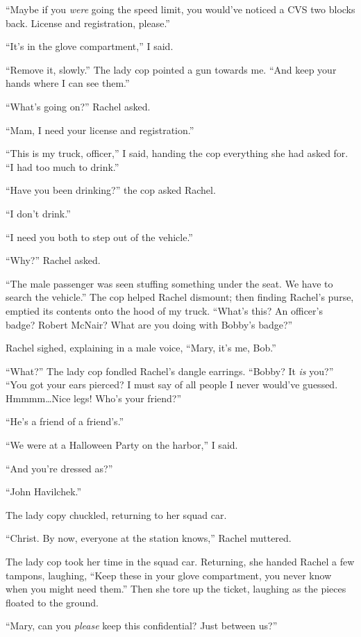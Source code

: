 ``Maybe if you \emph{were} going the speed limit, you would've noticed a
CVS two blocks back. License and registration, please.''

``It's in the glove compartment,'' I said.

``Remove it, slowly.'' The lady cop pointed a gun towards me. ``And keep
your hands where I can see them.''

``What's going on?'' Rachel asked.

``Mam, I need your license and registration.''

``This is my truck, officer,'' I said, handing the cop everything she
had asked for. ``I had too much to drink.''

``Have you been drinking?'' the cop asked Rachel.

``I don't drink.''

``I need you both to step out of the vehicle.''

``Why?'' Rachel asked.

``The male passenger was seen stuffing something under the seat. We have
to search the vehicle.'' The cop helped Rachel dismount; then finding
Rachel's purse, emptied its contents onto the hood of my truck. ``What's
this? An officer's badge? Robert McNair? What are you doing with Bobby's
badge?''

Rachel sighed, explaining in a male voice, ``Mary, it's me, Bob.''

``What?'' The lady cop fondled Rachel's dangle earrings. ``Bobby? It
\emph{is} you?'' ``You got your ears pierced? I must say of all people I
never would've guessed. Hmmmm\ldots Nice legs! Who's your friend?''

``He's a friend of a friend's.''

``We were at a Halloween Party on the harbor,'' I said.

``And you're dressed as?''

``John Havilchek.''

The lady copy chuckled, returning to her squad car.

``Christ. By now, everyone at the station knows,'' Rachel muttered.

The lady cop took her time in the squad car. Returning, she handed
Rachel a few tampons, laughing, ``Keep these in your glove compartment,
you never know when you might need them.'' Then she tore up the ticket,
laughing as the pieces floated to the ground.

``Mary, can you \emph{please} keep this confidential? Just between us?''

